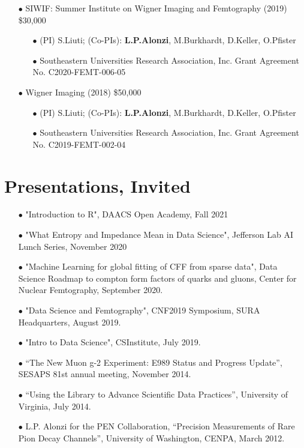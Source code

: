 \documentclass{article}[10pt]
\begin{document}
\begin{itemize}
\item[$\bullet$] SIWIF: Summer Institute on Wigner Imaging and Femtography (2019) \$30,000
\begin{itemize}
\item[$\bullet$] (PI) S.Liuti; (Co-PIs): {\bf L.P.Alonzi}, M.Burkhardt, D.Keller, O.Pfister
\item[$\bullet$] Southeastern Universities Research Association, Inc. Grant Agreement No. C2020-FEMT-006-05
\end{itemize}
\end{itemize}\begin{itemize}
\item[$\bullet$] Wigner Imaging (2018) \$50,000
\begin{itemize}
\item[$\bullet$] (PI) S.Liuti; (Co-PIs): {\bf L.P.Alonzi}, M.Burkhardt, D.Keller, O.Pfister
\item[$\bullet$] Southeastern Universities Research Association, Inc. Grant Agreement No. C2019-FEMT-002-04
\end{itemize}
\end{itemize}




\section*{Presentations, Invited}


\begin{itemize}
\item [$\bullet$] "Introduction to R", DAACS Open Academy, Fall 2021
\item [$\bullet$] "What Entropy and Impedance Mean in Data Science", Jefferson Lab AI Lunch Series, November 2020
\item [$\bullet$] "Machine Learning for global fitting of CFF from sparse data", Data Science Roadmap to compton form factors of quarks and gluons, Center for Nuclear Femtography, September 2020.
\item [$\bullet$] "Data Science and Femtography", CNF2019 Symposium, SURA Headquarters, August 2019.
\item [$\bullet$] "Intro to Data Science", CSInstitute, July 2019.
\item [$\bullet$] ``The New Muon g-2 Experiment: E989 Status and Progress Update'', SESAPS 81st annual meeting, November 2014.
\item [$\bullet$] ``Using the Library to Advance Scientific Data Practices'', University of Virginia, July 2014.
\item [$\bullet$] L.P. Alonzi for the PEN Collaboration, ``Precision Measurements of Rare Pion Decay Channels'', University of Washington, CENPA, March 2012.
\end{itemize}
\end{document}
